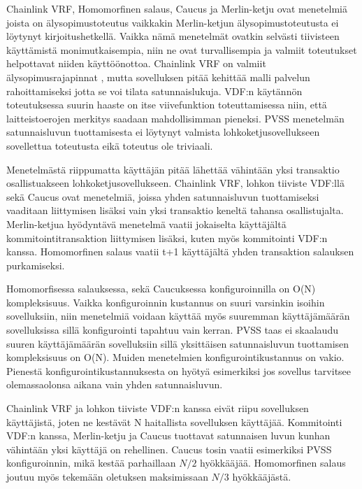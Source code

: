 Chainlink VRF, Homomorfinen salaus, Caucus ja Merlin-ketju ovat menetelmiä joista on älysopimustoteutus vaikkakin Merlin-ketjun älysopimustoteutusta ei löytynyt kirjoitushetkellä. Vaikka nämä menetelmät ovatkin selvästi tiivisteen käyttämistä monimutkaisempia, niin ne ovat turvallisempia ja valmiit toteutukset helpottavat niiden käyttöönottoa. Chainlink VRF on valmiit älysopimusrajapinnat \cite{noauthor_chainlink_nodate}, mutta sovelluksen pitää kehittää malli palvelun rahoittamiseksi jotta se voi tilata satunnaislukuja. VDF:n käytännön toteutuksessa suurin haaste on itse viivefunktion toteuttamisessa niin, että laitteistoerojen merkitys saadaan mahdollisimman pieneksi. PVSS menetelmän satunnaisluvun tuottamisesta ei löytynyt valmista lohkoketjusovellukseen sovellettua toteutusta eikä toteutus ole triviaali.

Menetelmästä riippumatta käyttäjän pitää lähettää vähintään yksi transaktio osallistuakseen lohkoketjusovellukseen. Chainlink VRF, lohkon tiiviste VDF:llä sekä Caucus ovat menetelmiä, joissa yhden satunnaisluvun tuottamiseksi vaaditaan liittymisen lisäksi vain yksi transaktio keneltä tahansa osallistujalta. Merlin-ketjua hyödyntävä menetelmä vaatii jokaiselta käyttäjältä kommitointitransaktion liittymisen lisäksi, kuten myös kommitointi VDF:n kanssa. Homomorfinen salaus vaatii t+1 käyttäjältä yhden transaktion salauksen purkamiseksi. 

Homomorfisessa salauksessa, sekä Caucuksessa konfiguroinnilla on O(N) kompleksisuus. Vaikka konfiguroinnin kustannus on suuri varsinkin isoihin sovelluksiin, niin menetelmiä voidaan käyttää myös suuremman käyttäjämäärän sovelluksissa sillä konfigurointi tapahtuu vain kerran. PVSS taas ei skaalaudu suuren käyttäjämäärän sovelluksiin sillä yksittäisen satunnaisluvun tuottamisen kompleksisuus on O(N). Muiden menetelmien konfigurointikustannus on vakio. Pienestä konfigurointikustannuksesta on hyötyä esimerkiksi jos sovellus tarvitsee olemassaolonsa aikana vain yhden satunnaisluvun.

Chainlink VRF ja lohkon tiiviste VDF:n kanssa eivät riipu sovelluksen käyttäjistä, joten ne kestävät N haitallista sovelluksen käyttäjää. Kommitointi VDF:n kanssa, Merlin-ketju ja Caucus tuottavat satunnaisen luvun kunhan vähintään yksi käyttäjä on rehellinen. Caucus tosin vaatii esimerkiksi PVSS konfiguroinnin, mikä kestää parhaillaan $N/2$ hyökkääjää. Homomorfinen salaus joutuu myös tekemään oletuksen maksimissaan $N/3$ hyökkääjästä.


